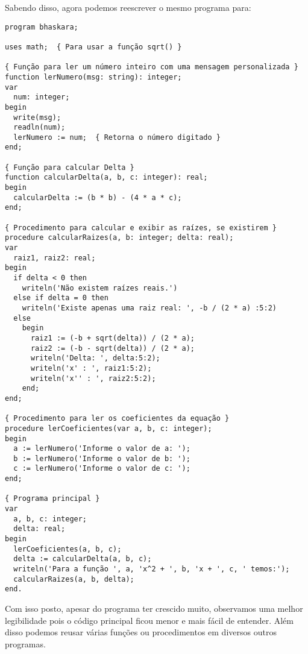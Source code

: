 Sabendo disso, agora podemos reescrever o mesmo programa para:
\begin{lstlisting}[]
program bhaskara;

uses math;  { Para usar a função sqrt() }

{ Função para ler um número inteiro com uma mensagem personalizada }
function lerNumero(msg: string): integer;
var
  num: integer;
begin
  write(msg);
  readln(num);
  lerNumero := num;  { Retorna o número digitado }
end;

{ Função para calcular Delta }
function calcularDelta(a, b, c: integer): real;
begin
  calcularDelta := (b * b) - (4 * a * c);
end;

{ Procedimento para calcular e exibir as raízes, se existirem }
procedure calcularRaizes(a, b: integer; delta: real);
var
  raiz1, raiz2: real;
begin
  if delta < 0 then
    writeln('Não existem raízes reais.')
  else if delta = 0 then
    writeln('Existe apenas uma raiz real: ', -b / (2 * a) :5:2)
  else
    begin
      raiz1 := (-b + sqrt(delta)) / (2 * a);
      raiz2 := (-b - sqrt(delta)) / (2 * a);
      writeln('Delta: ', delta:5:2);
      writeln('x' : ', raiz1:5:2);
      writeln('x'' : ', raiz2:5:2);
    end;
end;

{ Procedimento para ler os coeficientes da equação }
procedure lerCoeficientes(var a, b, c: integer);
begin
  a := lerNumero('Informe o valor de a: ');
  b := lerNumero('Informe o valor de b: ');
  c := lerNumero('Informe o valor de c: ');
end;

{ Programa principal }
var
  a, b, c: integer;
  delta: real;
begin
  lerCoeficientes(a, b, c);
  delta := calcularDelta(a, b, c);
  writeln('Para a função ', a, 'x^2 + ', b, 'x + ', c, ' temos:');
  calcularRaizes(a, b, delta);
end.
\end{lstlisting}

Com isso posto, apesar do programa ter crescido muito, observamos uma melhor legibilidade pois o código principal ficou menor e mais fácil de entender. Além disso podemos reusar várias funções ou procedimentos em diversos outros programas.

\clearpage
